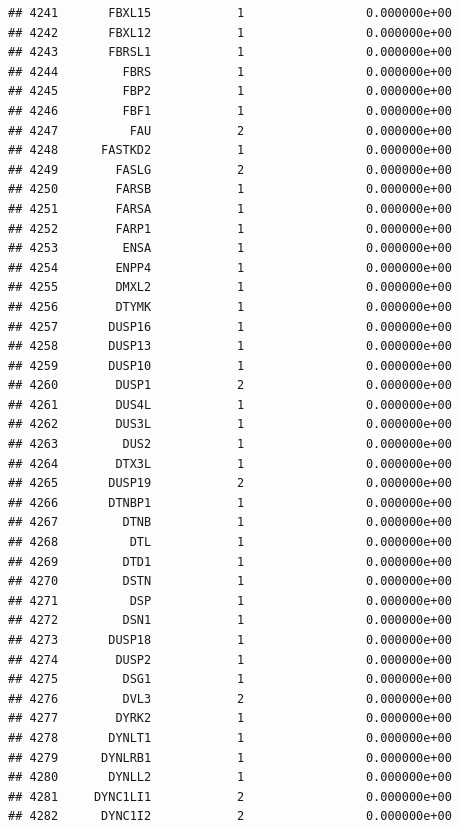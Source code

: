 \documentclass[
]{article}
\begin{document}
\begin{verbatim}
## 4241       FBXL15            1                 0.000000e+00
## 4242       FBXL12            1                 0.000000e+00
## 4243       FBRSL1            1                 0.000000e+00
## 4244         FBRS            1                 0.000000e+00
## 4245         FBP2            1                 0.000000e+00
## 4246         FBF1            1                 0.000000e+00
## 4247          FAU            2                 0.000000e+00
## 4248      FASTKD2            1                 0.000000e+00
## 4249        FASLG            2                 0.000000e+00
## 4250        FARSB            1                 0.000000e+00
## 4251        FARSA            1                 0.000000e+00
## 4252        FARP1            1                 0.000000e+00
## 4253         ENSA            1                 0.000000e+00
## 4254        ENPP4            1                 0.000000e+00
## 4255        DMXL2            1                 0.000000e+00
## 4256        DTYMK            1                 0.000000e+00
## 4257       DUSP16            1                 0.000000e+00
## 4258       DUSP13            1                 0.000000e+00
## 4259       DUSP10            1                 0.000000e+00
## 4260        DUSP1            2                 0.000000e+00
## 4261        DUS4L            1                 0.000000e+00
## 4262        DUS3L            1                 0.000000e+00
## 4263         DUS2            1                 0.000000e+00
## 4264        DTX3L            1                 0.000000e+00
## 4265       DUSP19            2                 0.000000e+00
## 4266       DTNBP1            1                 0.000000e+00
## 4267         DTNB            1                 0.000000e+00
## 4268          DTL            1                 0.000000e+00
## 4269         DTD1            1                 0.000000e+00
## 4270         DSTN            1                 0.000000e+00
## 4271          DSP            1                 0.000000e+00
## 4272         DSN1            1                 0.000000e+00
## 4273       DUSP18            1                 0.000000e+00
## 4274        DUSP2            1                 0.000000e+00
## 4275         DSG1            1                 0.000000e+00
## 4276         DVL3            2                 0.000000e+00
## 4277        DYRK2            1                 0.000000e+00
## 4278       DYNLT1            1                 0.000000e+00
## 4279      DYNLRB1            1                 0.000000e+00
## 4280       DYNLL2            1                 0.000000e+00
## 4281     DYNC1LI1            2                 0.000000e+00
## 4282      DYNC1I2            2                 0.000000e+00

\end{verbatim}
\end{document}
